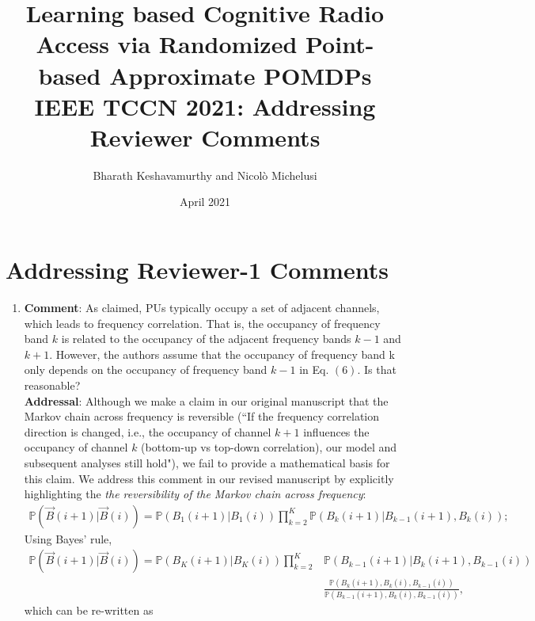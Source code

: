 \documentclass{article}
\title{Learning based Cognitive Radio Access via Randomized Point-based Approximate POMDPs\\\Large{IEEE TCCN 2021: Addressing Reviewer Comments}}
\author{Bharath Keshavamurthy and Nicol\`{o} Michelusi}
\date{April 2021}
\begin{document}
\maketitle
\section{Addressing Reviewer-1 Comments}

\begin{enumerate}

    \item \textbf{Comment}: As claimed, PUs typically occupy a set of adjacent channels, which leads to frequency correlation.  That is, the occupancy of frequency band $k$ is related to the occupancy of the adjacent frequency bands $k{-}1$ and $k{+}1$. However, the authors assume that the occupancy of frequency band k only depends on the occupancy of frequency band  $k{-}1$ in Eq. $(6)$. Is that reasonable?\\
    \textbf{Addressal}: Although we make a claim in our original manuscript that the Markov chain across frequency is reversible (``If the frequency correlation direction is changed, i.e., the occupancy of channel $k{+}1$ influences the occupancy of channel $k$ (bottom-up vs top-down correlation), our model and subsequent analyses still hold"), we fail to provide a mathematical basis for this claim. We address this comment in our revised manuscript by explicitly highlighting the \textit{the reversibility of the Markov chain across frequency}:
    \begin{equation}\label{6}
        \begin{aligned}
            \mathbb{P}(\vec{B}(i{+}1){|}\vec{B}(i)){=}\mathbb{P}(B_{1}(i{+}1)|B_{1}(i))\prod_{k{=}2}^{K}\mathbb{P}(B_{k}(i{+}1){|}B_{k{-}1}(i{+}1),B_{k}(i));
        \end{aligned}
    \end{equation}
    Using Bayes' rule,
    \begin{equation}\label{7}
        \begin{aligned}
            \mathbb{P}(\vec{B}(i{+}1){|}\vec{B}(i)){=}\mathbb{P}(B_{K}(i{+}1)|B_{K}(i))\prod_{k{=}2}^{K}&\mathbb{P}(B_{k{-}1}(i{+}1){|}B_{k}(i{+}1),B_{k{-}1}(i))\\&\frac{\mathbb{P}(B_{k}(i{+}1),B_{k}(i),B_{k{-}1}(i))}{\mathbb{P}(B_{k{-}1}(i{+}1),B_{k}(i),B_{k{-}1}(i))},
        \end{aligned}
    \end{equation}
    which can be re-written as
    \begin{equation}\label{8}

\end{equation}
\end{enumerate}
\end{document}
